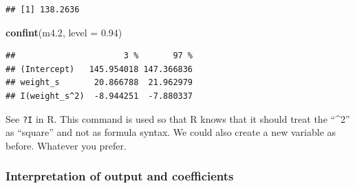 \documentclass[
]{book}
\newenvironment{Shaded}{\begin{snugshade}}{\end{snugshade}}
\newcommand{\AttributeTok}[1]{\textcolor[rgb]{0.13,0.29,0.53}{#1}}
\newcommand{\FloatTok}[1]{\textcolor[rgb]{0.00,0.00,0.81}{#1}}
\newcommand{\FunctionTok}[1]{\textcolor[rgb]{0.13,0.29,0.53}{\textbf{#1}}}
\newcommand{\NormalTok}[1]{#1}
\newcommand{\SpecialCharTok}[1]{\textcolor[rgb]{0.81,0.36,0.00}{\textbf{#1}}}
\begin{document}
\begin{Shaded}
\end{Shaded}

\begin{verbatim}
## [1] 138.2636
\end{verbatim}

\begin{Shaded}
\begin{Highlighting}[]
\FunctionTok{confint}\NormalTok{(m4}\FloatTok{.2}\NormalTok{, }\AttributeTok{level =} \FloatTok{0.94}\NormalTok{)}
\end{Highlighting}
\end{Shaded}

\begin{verbatim}
##                      3 %       97 %
## (Intercept)   145.954018 147.366836
## weight_s       20.866788  21.962979
## I(weight_s^2)  -8.944251  -7.880337
\end{verbatim}

See \texttt{?I} in R. This command is used so that R knows that it should
treat the ``\^{}2'' as ``square'' and not as formula syntax.
We could also create a new variable as before. Whatever you prefer.

\subsubsection{Interpretation of output and coefficients}\label{interpretation_output_freq_quadratic}
\end{document}
